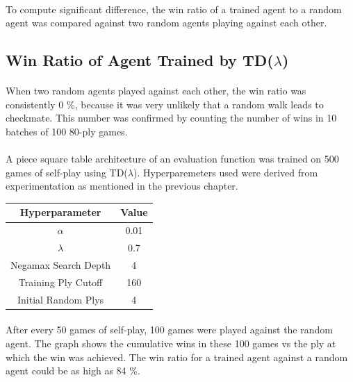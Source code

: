 \documentclass[12pt,a4paper]{book}
\begin{document}
\paragraph{} To compute significant difference, the win ratio of a trained agent to a random agent was compared against two random agents playing against each other.

\subsection{Win Ratio of Agent Trained by TD($\lambda$)}

\paragraph{} When two random agents played against each other, the win ratio was consistently 0 \%, because it was very unlikely that a random walk leads to checkmate. This number was confirmed by counting the number of wins in 10 batches of 100 80-ply games.

\paragraph{} A piece square table architecture of an evaluation function was trained on 500 games of self-play using TD($\lambda$). Hyperparemeters used were derived from experimentation as mentioned in the previous chapter.

\begin{center}
  \begin{tabular}{c | c }
    \hline
    \textbf{Hyperparameter} & \textbf{Value} \\ \hline
    $\alpha$ & 0.01 \\
    $\lambda$ & 0.7 \\
    Negamax Search Depth & 4 \\
    Training Ply Cutoff & 160 \\
    Initial Random Plys & 4 \\
    \hline
  \end{tabular}
\end{center}

\paragraph{} After every 50 games of self-play, 100 games were played against the random agent. The graph shows the cumulative wins in these 100 games vs the ply at which the win was achieved. The win ratio for a trained agent against a random agent could be as high as 84 \%. 
\end{document}
